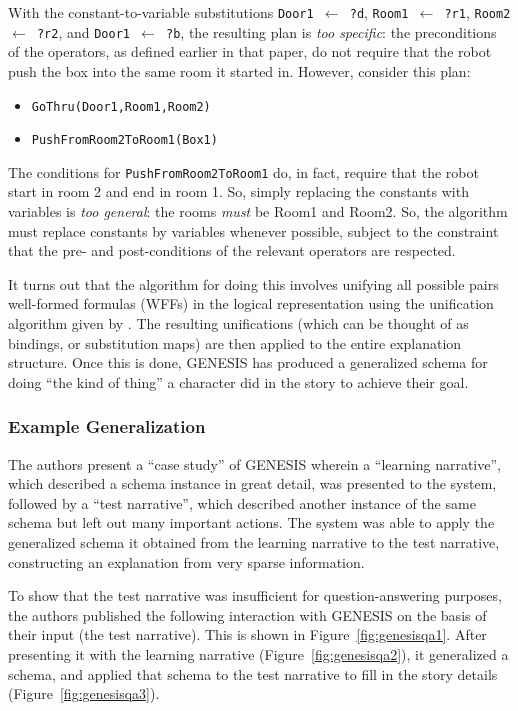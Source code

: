 With the constant-to-variable substitutions \texttt{Door1 $\gets$ ?d}, \texttt{Room1 $\gets$ ?r1}, \texttt{Room2 $\gets$ ?r2}, and \texttt{Door1 $\gets$ ?b}, the resulting plan is \textit{too specific}: the preconditions of the operators, as defined earlier in that paper, do not require that the robot push the box into the same room it started in. However, consider this plan:

\begin{itemize}
    \item \texttt{GoThru(Door1,Room1,Room2)}
    \item \texttt{PushFromRoom2ToRoom1(Box1)}
\end{itemize}

The conditions for \texttt{PushFromRoom2ToRoom1} do, in fact, require that the robot start in room 2 and end in room 1. So, simply replacing the constants with variables is \textit{too general}: the rooms \textit{must} be Room1 and Room2. So, the algorithm must replace constants by variables whenever possible, subject to the constraint that the pre- and post-conditions of the relevant operators are respected.

It turns out that the algorithm for doing this involves unifying all possible pairs well-formed formulas (WFFs) in the logical representation using the unification algorithm given by \citep{robinson1965machine}. The resulting unifications (which can be thought of as bindings, or substitution maps) are then applied to the entire explanation structure. Once this is done, GENESIS has produced a generalized schema for doing ``the kind of thing'' a character did in the story to achieve their goal.

\subsubsection{Example Generalization}
\label{sec:genesiseg}

The authors present a ``case study'' of GENESIS wherein a ``learning narrative'', which described a schema instance in great detail, was presented to the system, followed by a ``test narrative'', which described another instance of the same schema but left out many important actions. The system was able to apply the generalized schema it obtained from the learning narrative to the test narrative, constructing an explanation from very sparse information.

To show that the test narrative was insufficient for question-answering purposes, the authors published the following interaction with GENESIS on the basis of their input (the test narrative). This is shown in Figure~\vref{fig:genesisqa1}. After presenting it with the learning narrative (Figure~\vref{fig:genesisqa2}), it generalized a schema, and applied that schema to the test narrative to fill in the story details (Figure~\vref{fig:genesisqa3}).

